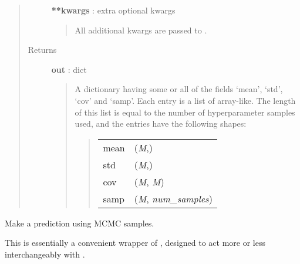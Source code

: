 \documentclass[letterpaper,10pt,english]{sphinxmanual}
\begin{document}
\begin{fulllineitems}
\begin{fulllineitems}
\begin{quote}
\begin{description}
\textbf{**kwargs} : extra optional kwargs
\begin{quote}

All additional kwargs are passed to
{\hyperref[gptools:gptools.gaussian_process.GaussianProcess.sample_hyperparameter_posterior]{}}.
\end{quote}

\item[{Returns}] \leavevmode
\textbf{out} : dict
\begin{quote}

A dictionary having some or all of the fields `mean', `std', `cov'
and `samp'. Each entry is a list of array-like. The length of this
list is equal to the number of hyperparameter samples used, and the
entries have the following shapes:
\begin{quote}

\begin{tabulary}{\linewidth}{|L|L|}
\hline

mean
 & 
(\emph{M},)
\\

std
 & 
(\emph{M},)
\\

cov
 & 
(\emph{M}, \emph{M})
\\

samp
 & 
(\emph{M}, \emph{num\_samples})
\\
\hline\end{tabulary}

\end{quote}
\end{quote}

\end{description}\end{quote}

\end{fulllineitems}


\begin{fulllineitems}
\label{gptools:gptools.gaussian_process.GaussianProcess.predict_MCMC}
Make a prediction using MCMC samples.

This is essentially a convenient wrapper of {\hyperref[gptools:gptools.gaussian_process.GaussianProcess.compute_from_MCMC]{}},
designed to act more or less interchangeably with {\hyperref[gptools:gptools.gaussian_process.GaussianProcess.predict]{}}.


\end{fulllineitems}
\end{fulllineitems}
\end{document}
